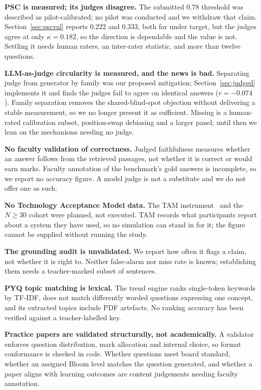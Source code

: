 \documentclass[conference]{IEEEtran}
\begin{document}
\textbf{PSC is measured; its judges disagree.} The submitted $0.78$ threshold
was described as pilot-calibrated; no pilot was conducted and we withdraw that
claim. Section~\ref{sec:pscval} reports $0.222$ and $0.333$, both far under
target, but the judges agree at only $\kappa = 0.182$, so the direction is
dependable and the value is not. Settling it needs human raters, an inter-rater
statistic, and more than twelve questions.

\textbf{LLM-as-judge circularity is measured, and the news is bad.} Separating
judge from generator by family was our proposed mitigation;
Section~\ref{sec:judged} implements it and finds the judges fail to agree on
identical answers ($r = -0.074$). Family separation removes the
shared-blind-spot objection without delivering a stable measurement, so we no
longer present it as sufficient. Missing is a human-rated calibration subset,
position-swap debiasing and a larger panel; until then we lean on the
mechanisms needing no judge.

\textbf{No faculty validation of correctness.} Judged faithfulness measures
whether an answer follows from the retrieved passages, not whether it is
correct or would earn marks. Faculty annotation of the benchmark's gold answers
is incomplete, so we report no accuracy figure. A model judge is not a
substitute and we do not offer one as such.

\textbf{No Technology Acceptance Model data.} The TAM
instrument~\cite{davis1989} and the $N \geq 30$ cohort were planned, not
executed. TAM records what participants report about a system they have used,
so no simulation can stand in for it; the figure cannot be supplied without
running the study.

\textbf{The grounding audit is unvalidated.} We report how often it flags a
claim, not whether it is right to. Neither false-alarm nor miss rate is known;
establishing them needs a teacher-marked subset of sentences.

\textbf{PYQ topic matching is lexical.} The trend engine ranks single-token
keywords by TF-IDF, does not match differently worded questions expressing one
concept, and its extracted topics include PDF artefacts. No ranking accuracy
has been verified against a teacher-labelled key.

\textbf{Practice papers are validated structurally, not academically.} A
validator enforces question distribution, mark allocation and internal choice,
so format conformance is checked in code. Whether questions meet board
standard, whether an assigned Bloom level matches the question generated, and
whether a paper aligns with learning outcomes are content judgements needing
faculty annotation.
\end{document}
